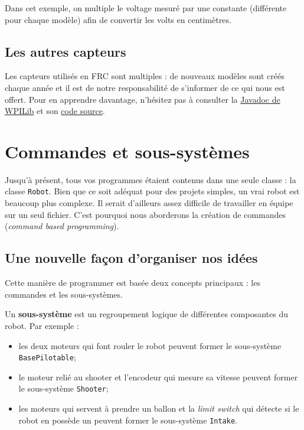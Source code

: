 \documentclass[12pt]{report}
\begin{document}
Dans cet exemple, on multiple le voltage mesuré par une constante (différente pour chaque modèle) afin de convertir les volts en centimètres.

\section{Les autres capteurs}

Les capteurs utilisés en FRC sont multiples : de nouveaux modèles sont créés chaque année et il est de notre responsabilité de s'informer de ce qui nous est offert. Pour en apprendre davantage, n'hésitez pas à consulter la \href{http://first.wpi.edu/FRC/roborio/release/docs/java/}{Javadoc de WPILib} et son \href{https://github.com/wpilibsuite/allwpilib}{code source}.

\chapter{Commandes et sous-systèmes}

Jusqu'à présent, tous vos programmes étaient contenus dans une seule classe : la classe \texttt{Robot}. Bien que ce soit adéquat pour des projets simples, un vrai robot est beaucoup plus complexe. Il serait d'ailleurs assez difficile de travailler en équipe sur un seul fichier. C'est pourquoi nous aborderons la création de commandes (\textit{command based programming}).

\section{Une nouvelle façon d'organiser nos idées}

Cette manière de programmer est basée deux concepts principaux : les commandes et les sous-systèmes. 

Un \textbf{sous-système} est un regroupement logique de différentes composantes du robot. Par exemple :

\begin{itemize}
	\item les deux moteurs qui font rouler le robot peuvent former le sous-système \texttt{BasePilotable};
	\item le moteur relié au shooter et l'encodeur qui mesure sa vitesse peuvent former le sous-système \texttt{Shooter};
	\item les moteurs qui servent à prendre un ballon et la \textit{limit switch} qui détecte si le robot en possède un peuvent former le sous-système \texttt{Intake}.
\end{itemize}
\end{document}
